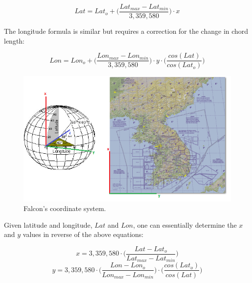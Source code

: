 \documentclass[11pt,letterpaper,titlepage]{article}
\begin{document}
\begin{equation}
Lat=Lat_o + \biggr( \frac{Lat_{max}-Lat_{min}}{3,359,580} \biggr)\cdot x
\end{equation}

\noindent
The longitude formula is similar but requires a correction for the change in chord length:

\begin{equation}
Lon=Lon_o + \biggr( \frac{Lon_{max}-Lon_{min}}{3,359,580} \biggr)\cdot y \cdot \biggr(\frac{cos(Lat)}{cos(Lat_o)}\biggr)
\end{equation}


\begin{center}
	\begin{minipage}[c]{0.8\textwidth}	
		\begin{figure}[H]
			
			\includegraphics[width=5.5in]{Coordinates.png}
			\caption{Falcon's coordinate system.}
			\label{figure:ZZZ_Coordinates}
		\end{figure}
	\end{minipage}
\end{center}

\newpage
Given latitude and longitude, $Lat$ and $Lon$, one can essentially determine the $x$ and $y$ values in reverse of the above equations:

\begin{equation}
x= 3,359,580 \cdot \biggr( \frac{Lat - Lat_o}{Lat_{max}-Lat_{min}} \biggr)
\end{equation}
\begin{equation}
y= 3,359,580 \cdot \biggr( \frac{Lon - Lon_o}{Lon_{max}-Lon_{min}} \biggr)\cdot \biggr( \frac{cos(Lat_o)}{cos(Lat)} \biggr)
\end{equation}
\end{document}
